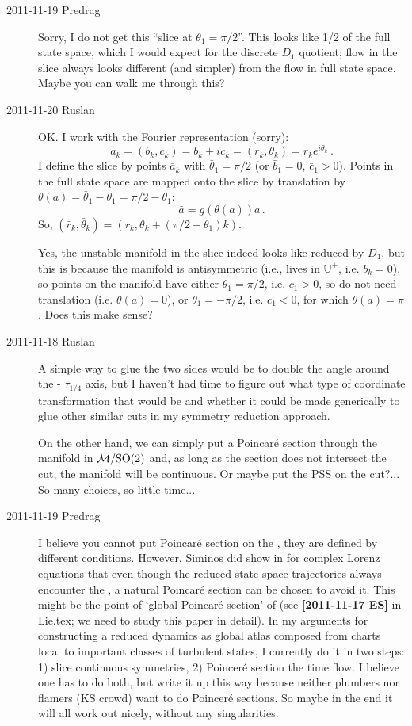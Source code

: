 \begin{description}
\item[2011-11-19 Predrag] Sorry, I do not get this ``slice at $\theta_1 =
\pi/2$''. This looks like 1/2 of the full state space, which I would expect
for the discrete $D_1$ quotient; flow in the slice always looks different
(and simpler) from the flow in full state space. Maybe you can walk me
through this?

\item[2011-11-20 Ruslan] OK. I work with the Fourier representation (sorry):
\[ a_k = (b_k, c_k) = b_k + ic_k = (r_k, \theta_k) = r_k e^{i\theta_k}\,. \]
I define the slice by points $\bar{a}_k$ with $\bar{\theta}_1 = \pi/2$  (or $\bar{b}_1 = 0$, $\bar{c}_1 > 0$).  Points in the full state space are mapped onto the slice by translation by $\theta(a) = \bar{\theta}_1 - \theta_1 = \pi/2 - \theta_1$:
\[ \bar{a} = g(\theta(a)) a\,. \]
So, $(\bar{r}_k, \bar{\theta}_k) = (r_k, \theta_k + (\pi/2 - \theta_1)k)$.

Yes, the  unstable manifold in the slice indeed looks like reduced by $D_1$, but this is because the manifold is antisymmetric (i.e., lives in $\mathbb{U}^+$, i.e. $b_k = 0$), so points on the manifold have either $\theta_1 = \pi/2$, i.e. $c_1 > 0$, so do not need translation (i.e. $\theta(a) = 0$), or $\theta_1 = -\pi/2$, i.e. $c_1 < 0$, for which $\theta(a) = \pi$.  Does this make sense?

\item[2011-11-18 Ruslan]
    A simple way to glue the two sides would be to double the angle
    around the  - $\tau_{1/4}$  axis, but I haven't had
    time to figure out what type of coordinate transformation that would
    be and whether it could be made generically to glue other similar
    cuts in my symmetry reduction approach.

    On the other hand, we can simply put a Poincar\'e section through the
    manifold in ${\cal M}/\textrm{SO}(2)$ and, as long as the section does not intersect
    the cut, the manifold will be continuous.  Or maybe put the PSS on
    the cut?...  So many choices, so little time...

\item[2011-11-19 Predrag] I believe you cannot put Poincar\'e section on
the \sset, they are defined by different conditions. However, Siminos did
show in  for complex Lorenz equations that even though
the reduced state space trajectories always encounter the \sset, a natural
Poincar\'e section can be chosen to avoid it. This might be the point of
`global Poincar\'{e} section' of  (see {\bf [2011-11-17
ES] } in Lie.tex; we need to study this paper in detail). In my
arguments for constructing a reduced dynamics as global atlas
composed from charts local to important classes of turbulent states, I
currently do it in two steps: 1) slice continuous symmetries, 2)
Poincer\'e section the time flow. I believe one has to do both, but write
it up this way because neither plumbers nor flamers (KS crowd) want to do
Poincer\'e sections. So maybe in the end it will all work out nicely,
without any singularities.


\end{description}
